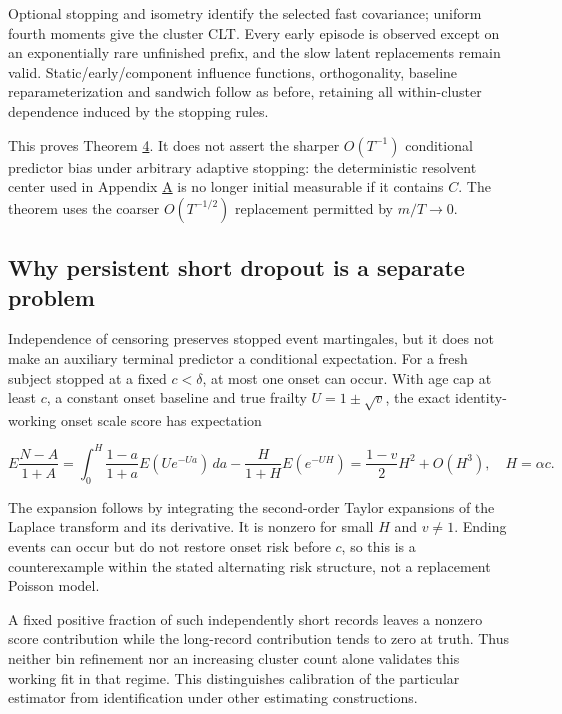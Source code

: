 \documentclass[11pt]{article}
\begin{document}
Optional stopping and isometry identify the selected fast covariance; uniform fourth moments give the cluster CLT. Every early episode is observed except on an exponentially rare unfinished prefix, and the slow latent replacements remain valid. Static/early/component influence functions, orthogonality, baseline reparameterization and sandwich follow as before, retaining all within-cluster dependence induced by the stopping rules.

This proves Theorem \hyperref[res:Theorem-4]{4}. It does not assert the sharper \(O(T^{-1})\) conditional predictor bias under arbitrary adaptive stopping: the deterministic resolvent center used in Appendix \hyperref[sec:A]{A} is no longer initial measurable if it contains \(C\). The theorem uses the coarser \(O(T^{-1/2})\) replacement permitted by \(m/T\to0\).

\subsection{Why persistent short dropout is a separate problem}\label{sec:G.7}

Independence of censoring preserves stopped event martingales, but it does not make an auxiliary terminal predictor a conditional expectation. For a fresh subject stopped at a fixed \(c<\delta\), at most one onset can occur. With age cap at least \(c\), a constant onset baseline and true frailty \(U=1\pm\sqrt v\), the exact identity-working onset scale score has expectation

\begin{equation*}
E\frac{N-A}{1+A}
=\int_0^H\frac{1-a}{1+a}E(Ue^{-Ua})\,da
-\frac{H}{1+H}E(e^{-UH})
=\frac{1-v}{2}H^2+O(H^3),\quad H=\alpha c.
\tag{G.9}\label{eq:G.9}
\end{equation*}

The expansion follows by integrating the second-order Taylor expansions of the Laplace transform and its derivative. It is nonzero for small \(H\) and \(v\ne1\). Ending events can occur but do not restore onset risk before \(c\), so this is a counterexample within the stated alternating risk structure, not a replacement Poisson model.

A fixed positive fraction of such independently short records leaves a nonzero score contribution while the long-record contribution tends to zero at truth. Thus neither bin refinement nor an increasing cluster count alone validates this working fit in that regime. This distinguishes calibration of the particular estimator from identification under other estimating constructions.
\end{document}
